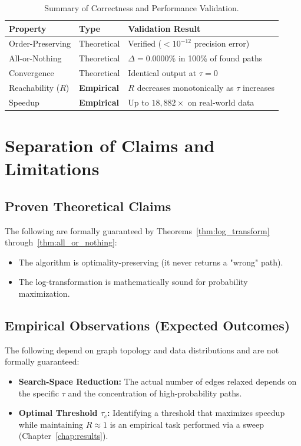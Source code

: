 \begin{table}[htbp]
\centering
\renewcommand{\arraystretch}{1.3}
\begin{tabular}{@{}lll@{}}
\toprule
\textbf{Property} & \textbf{Type} & \textbf{Validation Result} \\
\midrule
Order-Preserving & Theoretical & Verified ($<10^{-12}$ precision error) \\
All-or-Nothing & Theoretical & $\Delta = 0.0000\%$ in 100\% of found paths \\
Convergence & Theoretical & Identical output at $\tau = 0$ \\
Reachability ($R$) & \textbf{Empirical} & $R$ decreases monotonically as $\tau$ increases \\
Speedup & \textbf{Empirical} & Up to $18{,}882\times$ on real-world data \\
\bottomrule
\end{tabular}
\caption{Summary of Correctness and Performance Validation.}
\label{table:correctness_summary}
\end{table}

\section{Separation of Claims and Limitations}

\subsection{Proven Theoretical Claims}
The following are formally guaranteed by Theorems~\ref{thm:log_transform} through~\ref{thm:all_or_nothing}:
\begin{itemize}
    \item The algorithm is optimality-preserving (it never returns a "wrong" path).
    \item The log-transformation is mathematically sound for probability maximization.
\end{itemize}

\subsection{Empirical Observations (Expected Outcomes)}
The following depend on graph topology and data distributions and are not formally guaranteed:
\begin{itemize}
    \item \textbf{Search-Space Reduction:} The actual number of edges relaxed depends on the specific $\tau$ and the concentration of high-probability paths.
    \item \textbf{Optimal Threshold $\tau_c$:} Identifying a threshold that maximizes speedup while maintaining $R \approx 1$ is an empirical task performed via a sweep (Chapter~\ref{chap:results}).
\end{itemize}


